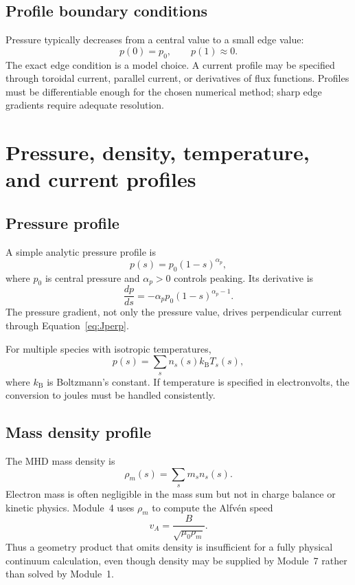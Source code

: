 \subsection{Profile boundary conditions}
Pressure typically decreases from a central value to a small edge value:
\begin{equation}
p(0)=p_0,
\qquad
p(1)\approx0.
\end{equation}
The exact edge condition is a model choice. A current profile may be specified through toroidal current, parallel current, or derivatives of flux functions. Profiles must be differentiable enough for the chosen numerical method; sharp edge gradients require adequate resolution.

\section{Pressure, density, temperature, and current profiles}
\label{sec:profiles}

\subsection{Pressure profile}
A simple analytic pressure profile is
\begin{equation}
p(s)=p_0(1-s)^{\alpha_p},
\label{eq:pressure_profile_example}
\end{equation}
where $p_0$ is central pressure and $\alpha_p>0$ controls peaking. Its derivative is
\begin{equation}
\frac{dp}{ds}=-\alpha_p p_0(1-s)^{\alpha_p-1}.
\end{equation}
The pressure gradient, not only the pressure value, drives perpendicular current through Equation~\eqref{eq:Jperp}.

For multiple species with isotropic temperatures,
\begin{equation}
p(s)=\sum_s n_s(s)k_{\mathrm B}T_s(s),
\label{eq:multispecies_pressure}
\end{equation}
where $k_{\mathrm B}$ is Boltzmann's constant. If temperature is specified in electronvolts, the conversion to joules must be handled consistently.

\subsection{Mass density profile}
The MHD mass density is
\begin{equation}
\rho_m(s)=\sum_s m_s n_s(s).
\label{eq:mass_density_species}
\end{equation}
Electron mass is often negligible in the mass sum but not in charge balance or kinetic physics. Module~4 uses $\rho_m$ to compute the Alfv\'en speed
\begin{equation}
v_A=\frac{B}{\sqrt{\mu_0\rho_m}}.
\label{eq:alfven_speed_module1}
\end{equation}
Thus a geometry product that omits density is insufficient for a fully physical continuum calculation, even though density may be supplied by Module~7 rather than solved by Module~1.

